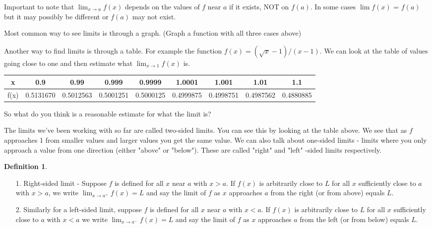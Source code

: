 \documentclass[12pt,reqno]{article}
\theoremstyle{definition}
\newtheorem*{Definition}{Definition}
\begin{document}
Important to note that $\lim_{x \to a} f(x)$ depends on the values of $f$ near $a$ if it exists, NOT on $f(a)$. In some cases $\lim f(x)$ = $f(a)$ but it may possibly be different or $f(a)$ may not exist. 



Most common way to see limits is through a graph. (Graph a function with all three cases above)

Another way to find limits is through a table. For example the function $f(x) = (\sqrt{x} - 1)/(x - 1)$. We can look at the table of values going close to one and then estimate what $\lim_{x \to 1} f(x)$ is. 

\begin{tabular}{| c | c | c | c | c | c | c | c | c |} \hline
	x & 0.9 & 0.99 & 0.999 & 0.9999 & 1.0001 & 1.001 & 1.01 & 1.1 \\
	 \hline
	f(x) & 0.5131670 & 0.5012563 & 0.5001251 & 0.5000125 & 0.4999875 & 0.4998751 & 0.4987562 & 0.4880885 \\
	\hline
\end{tabular}

So what do you think is a reasonable estimate for what the limit is? 


The limits we've been working with so far are called two-sided limits. You can see this by looking at the table above. We see that as $f$ approaches 1 from smaller values and larger values you get the same value. We can also talk about one-sided limits - limits where you only approach a value from one direction (either "above" or "below"). These are called "right" and "left" -sided limits respectively. 

\begin{Definition}
	
	
	\begin{enumerate}
		\item[1.] Right-sided limit - Suppose $f$ is defined for all $x$ near $a$ with $x > a$. If $f(x)$ is arbitrarily close to $L$ for all $x$ sufficiently close to $a$ with $x > a$, we write $\lim_{x \to a^{+}} f(x) = L$ and say the limit of $f$ as $x$ approaches $a$ from the right (or from above) equals $L$. 
		\item[2.] Similarly for a left-sided limit, suppose $f$ is defined for all $x$ near $a$ with $x < a$. If $f(x)$ is arbitrarily close to $L$ for all $x$ sufficiently close to $a$ with $x < a$ we write $\lim_{x \to a^{-}} f(x) = L$ and say the limit of $f$ as $x$ approaches $a$ from the left (or from below) equals $L$. 
	\end{enumerate}


\end{Definition}
\end{document}
